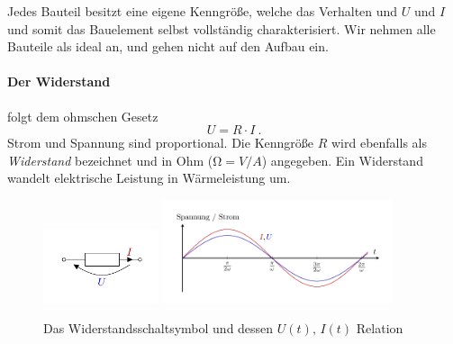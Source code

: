 Jedes Bauteil besitzt eine eigene Kenngröße, welche das Verhalten und $U$ und $I$ und somit das Bauelement selbst
vollständig charakterisiert. Wir nehmen alle Bauteile als ideal an, und gehen nicht auf den Aufbau ein.

\paragraph*{Der Widerstand} folgt dem ohmschen Gesetz
\begin{equation}\label{eq:R}
    U = R\cdot I ~.
\end{equation}
Strom und Spannung sind proportional. Die Kenngröße $R$ wird ebenfalls als \emph{Widerstand} bezeichnet und in Ohm
($\si{\ohm} = \si{V}/\si{A}$) angegeben. Ein Widerstand wandelt elektrische Leistung in Wärmeleistung um.
\begin{figure}[H]
    \centering
    \includegraphics[width=0.3\textwidth]{kBR.pdf}
    \includegraphics[width=0.6\textwidth]{kPR.pdf}
    \caption{Das Widerstandsschaltsymbol und dessen $U(t),\, I(t)$ Relation}
\end{figure}

